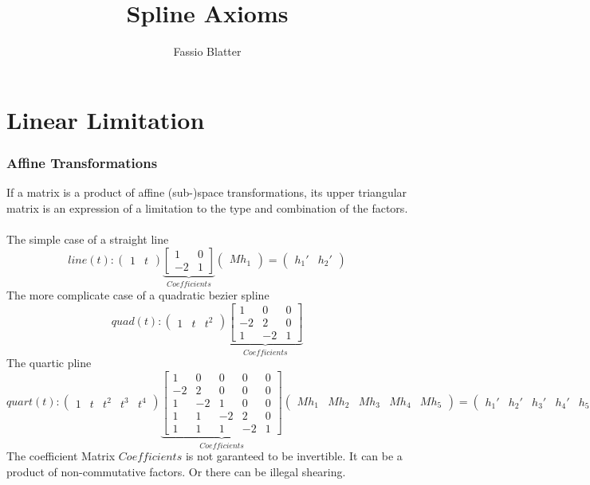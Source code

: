 \documentclass{report}
\begin{document}
\title{Spline Axioms}
\author{Fassio Blatter}
\maketitle

\chapter{Linear Limitation}

\subsection{Affine Transformations}
If a matrix is a product of affine (sub-)space transformations, its upper triangular matrix is an expression of a limitation to the type and combination of the factors.\\\\
The simple case of a straight line
\begin{equation}
line(t):
\begin{pmatrix}
1 & t
\end{pmatrix}
\underbrace{\begin{bmatrix}
1 & 0\\
-2 & 1
\end{bmatrix}}_{Coefficients}
\begin{pmatrix}
Mh_{1}
\end{pmatrix}
=
\begin{pmatrix}
h_{1}' & h_{2}'
\end{pmatrix}
\end{equation}
The more complicate case of a quadratic bezier spline
\begin{equation}
quad(t):
\begin{pmatrix}
1 & t & t^2
\end{pmatrix}
\underbrace{\begin{bmatrix}
1 & 0 & 0\\
-2 & 2 & 0\\
1 & -2 &1
\end{bmatrix}}_{Coefficients}
\end{equation}
The quartic pline
\begin{equation}
quart(t):
\begin{pmatrix}
1 & t & t^2 & t^3 & t^4
\end{pmatrix}
\underbrace{\begin{bmatrix}
1 & 0 & 0 & 0 & 0\\
-2 & 2 & 0 & 0 & 0\\
1 & -2 &1 & 0 & 0\\
1 & 1 & -2 & 2 & 0\\
1 & 1 & 1 & -2 & 1
\end{bmatrix}}_{Coefficients}
\begin{pmatrix}
Mh_{1} & Mh_{2} & Mh_{3} & Mh_{4} & Mh_{5}
\end{pmatrix}
=
\begin{pmatrix}
h_{1}' & h_{2}' & h_{3}' & h_{4}' & h_{5}'
\end{pmatrix}
\end{equation}
The coefficient Matrix $Coefficients$ is not garanteed to be invertible. It can be a product of non-commutative factors. Or there can be illegal shearing.
\end{document}
